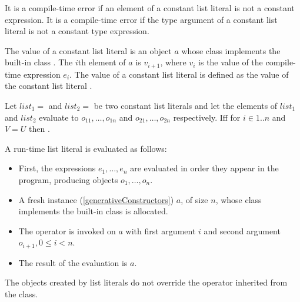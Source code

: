 \documentclass[makeidx]{article}
\begin{document}
\LMHash{}%
It is a compile-time error if an element of a constant list literal is not a constant expression.
It is a compile-time error if the type argument of a constant list literal is
not a constant type expression.

\LMHash{}%
The value of a constant list literal
is an object $a$ whose class implements the built-in class
.
The $i$th element of $a$ is $v_{i+1}$, where $v_i$ is the value of the compile-time expression $e_i$.
The value of a constant list literal
\code{\CONST{} [$e_1, \ldots, e_n$]}
is defined as the value of the constant list literal
\code{\CONST{} <\DYNAMIC{}>[$e_1, \ldots, e_n$]}.

\LMHash{}%
Let
$list_1 =$ 
and
$list_2 =$ 
be two constant list literals and let the elements of $list_1$ and $list_2$ evaluate to $o_{11}, \ldots, o_{1n}$ and $o_{21}, \ldots, o_{2n}$ respectively.
If{}f  for $i \in 1 .. n$ and $V = U$ then .


\LMHash{}%
A run-time list literal
is evaluated as follows:
\begin{itemize}
\item
First, the expressions $e_1, \ldots, e_n$ are evaluated in order they appear in the program, producing objects $o_1, \ldots, o_n$.
\item A fresh instance (\ref{generativeConstructors}) $a$, of size $n$, whose class implements the built-in class
is allocated.
\item
The operator  is invoked on $a$ with first argument $i$ and second argument
$o_{i+1}, 0 \le i < n$.
\item
The result of the evaluation is $a$.
\end{itemize}

\LMHash{}%
The objects created by list literals do not override
the \code{==} operator inherited from the  class.

\end{document}
